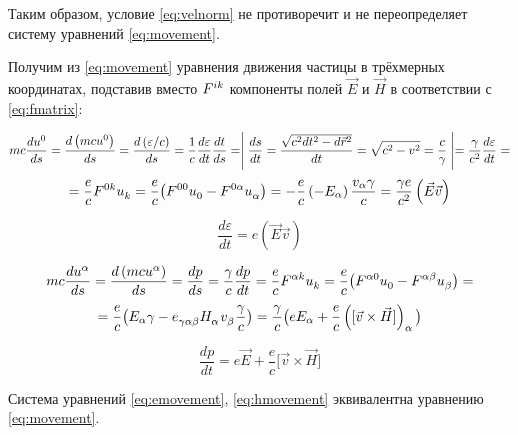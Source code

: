 \documentclass{article}
\begin{document}
Таким образом, условие \eqref{eq:velnorm} не противоречит и не переопределяет систему уравнений \eqref{eq:movement}.

Получим из \eqref{eq:movement} уравнения движения частицы в трёхмерных координатах, подставив вместо $\tensor{F}{^i^k}$ компоненты полей $\vec{E}$ и $\vec{H}$ в соответствии с \eqref{eq:fmatrix}:

\begin{equation*}
    mc\frac{d\tensor{u}{^0}}{ds}=\frac{d\left(mc\tensor{u}{^0}\right)}{ds}=\frac{d\left(\varepsilon/c\right)}{ds}=\frac{1}{c}\frac{d\varepsilon}{dt}\frac{dt}{ds}=\Biggm\lvert\frac{ds}{dt}=\frac{\sqrt{c^2dt^2-d\vec{r}^2}}{dt}=\sqrt{c^2-v^2}=\frac{c}{\gamma}\Biggm\rvert=\frac{\gamma}{c^2}\frac{d\varepsilon}{dt}=
\end{equation*}
\begin{equation*}
    =\frac{e}{c}\tensor{F}{^0^k}\tensor{u}{_k}=\frac{e}{c}\big(\tensor{F}{^0^0}\tensor{u}{_0}-\tensor{F}{^0^\alpha}\tensor{u}{_\alpha}\big)    =-\frac{e}{c}\left(-E_\alpha\right)\frac{v_\alpha\gamma}{c}=\frac{\gamma e}{c^2}\left(\vec{E}\vec{v}\right)
\end{equation*}

\begin{equation}\label{eq:emovement}
    \frac{d\varepsilon}{dt}=e\left(\vec{E}\vec{v}\right)
\end{equation}

\begin{equation*}
    mc\frac{d\tensor{u}{^\alpha}}{ds}=\frac{d\left(mc\tensor{u}{^\alpha}\right)}{ds}=\frac{dp}{ds}=\frac{\gamma}{c}\frac{dp}{dt}=\frac{e}{c}\tensor{F}{^\alpha^k}\tensor{u}{_k}=\frac{e}{c}\big(\tensor{F}{^\alpha^0}\tensor{u}{_0}-\tensor{F}{^\alpha^\beta}\tensor{u}{_\beta}\big)=
\end{equation*}
\begin{equation*}
    =\frac{e}{c}\big(E_\alpha\gamma-\tensor{e}{_\gamma_\alpha_\beta}\tensor{H}{_\alpha}\tensor{v}{_\beta}\frac{\gamma}{c}\big)=\frac{\gamma}{c}\big(eE_\alpha+\frac{e}{c}\left(\lbrack\vec{v}\times\vec{H}\rbrack\right)_\alpha\big)
\end{equation*}

\begin{equation}\label{eq:hmovement}
    \frac{dp}{dt}=e\vec{E}+\frac{e}{c}\lbrack\vec{v}\times\vec{H}\rbrack
\end{equation}

Система уравнений \eqref{eq:emovement}, \eqref{eq:hmovement} эквивалентна уравнению \eqref{eq:movement}.
\end{document}
